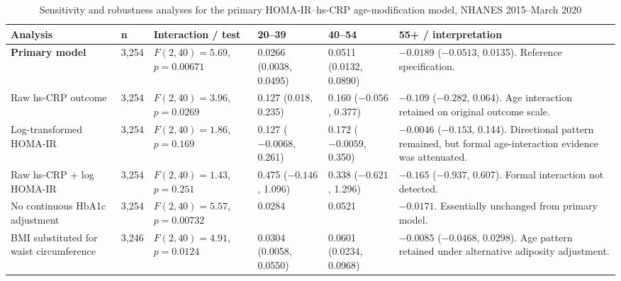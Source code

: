 

\begin{landscape}
\begin{table}[p]
\centering
\begin{threeparttable}
\caption{Sensitivity and robustness analyses for the primary
HOMA-IR--hs-CRP age-modification model, NHANES 2015--March 2020}
\label{tab:S1}
\scriptsize
\setlength{\tabcolsep}{4pt}
\begin{tabular}{p{3.1cm} p{2.0cm} p{2.8cm} p{2.8cm} p{2.8cm} p{3.4cm}}
\toprule
\textbf{Analysis} &
\textbf{n} &
\textbf{Interaction / test} &
\textbf{20--39} &
\textbf{40--54} &
\textbf{55+ / interpretation} \\
\midrule

\textbf{Primary model} &
3,254 &
$F(2,40)=5.69$, $p=0.00671$ &
0.0266 (0.0038, 0.0495) &
0.0511 (0.0132, 0.0890) &
$-0.0189$ ($-0.0513$, 0.0135).
Reference specification. \\

\addlinespace

Raw hs-CRP outcome &
3,254 &
$F(2,40)=3.96$, $p=0.0269$ &
0.127 (0.018, 0.235) &
0.160 ($-0.056$, 0.377) &
$-0.109$ ($-0.282$, 0.064).
Age interaction retained on original outcome scale. \\

\addlinespace

Log-transformed HOMA-IR &
3,254 &
$F(2,40)=1.86$, $p=0.169$ &
0.127 ($-0.0068$, 0.261) &
0.172 ($-0.0059$, 0.350) &
$-0.0046$ ($-0.153$, 0.144).
Directional pattern remained, but formal age-interaction evidence was attenuated. \\

\addlinespace

Raw hs-CRP + log HOMA-IR &
3,254 &
$F(2,40)=1.43$, $p=0.251$ &
0.475 ($-0.146$, 1.096) &
0.338 ($-0.621$, 1.296) &
$-0.165$ ($-0.937$, 0.607).
Formal interaction not detected. \\

\addlinespace

No continuous HbA1c adjustment &
3,254 &
$F(2,40)=5.57$, $p=0.00732$ &
0.0284 &
0.0521 &
$-0.0171$.
Essentially unchanged from primary model. \\

\addlinespace

BMI substituted for waist circumference\tnote{a} &
3,246 &
$F(2,40)=4.91$, $p=0.0124$ &
0.0304 (0.0058, 0.0550) &
0.0601 (0.0234, 0.0968) &
$-0.0085$ ($-0.0468$, 0.0298).
Age pattern retained under alternative adiposity adjustment. \\


\end{tabular}
\end{threeparttable}
\end{table}
\end{landscape}
